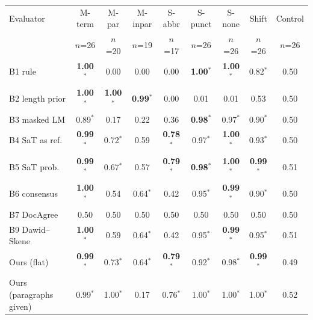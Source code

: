 \begin{tabular}{lcccccccc}
\toprule
Evaluator & M-term & M-par & M-inpar & S-abbr & S-punct & S-none & Shift & Control \\
 & {\tiny $n$=26} & {\tiny $n$=20} & {\tiny $n$=19} & {\tiny $n$=17} & {\tiny $n$=26} & {\tiny $n$=26} & {\tiny $n$=26} & {\tiny $n$=26} \\
\midrule
B1 rule & \textbf{1.00}$^*$ & 0.00 & 0.00 & 0.00 & \textbf{1.00}$^*$ & \textbf{1.00}$^*$ & 0.82$^*$ & 0.50 \\
B2 length prior & \textbf{1.00}$^*$ & \textbf{1.00}$^*$ & \textbf{0.99}$^*$ & 0.00 & 0.01 & 0.01 & 0.53 & 0.50 \\
B3 masked LM & 0.89$^*$ & 0.17 & 0.22 & 0.36 & \textbf{0.98}$^*$ & 0.97$^*$ & 0.90$^*$ & 0.50 \\
B4 SaT as ref. & \textbf{0.99}$^*$ & 0.72$^*$ & 0.59 & \textbf{0.78}$^*$ & 0.97$^*$ & \textbf{1.00}$^*$ & 0.93$^*$ & 0.50 \\
B5 SaT prob. & \textbf{0.99}$^*$ & 0.67$^*$ & 0.57 & \textbf{0.79}$^*$ & \textbf{0.98}$^*$ & \textbf{1.00}$^*$ & \textbf{0.99}$^*$ & 0.51 \\
B6 consensus & \textbf{1.00}$^*$ & 0.54 & 0.64$^*$ & 0.42 & 0.95$^*$ & \textbf{0.99}$^*$ & 0.90$^*$ & 0.50 \\
B7 DocAgree & 0.50 & 0.50 & 0.50 & 0.50 & 0.50 & 0.50 & 0.50 & 0.50 \\
B9 Dawid--Skene & \textbf{1.00}$^*$ & 0.59 & 0.64$^*$ & 0.42 & 0.95$^*$ & \textbf{0.99}$^*$ & 0.95$^*$ & 0.51 \\
Ours (flat) & \textbf{0.99}$^*$ & 0.73$^*$ & 0.64$^*$ & \textbf{0.79}$^*$ & 0.92$^*$ & 0.98$^*$ & \textbf{0.99}$^*$ & 0.49 \\
\midrule
Ours (paragraphs given) & 0.99$^*$ & 1.00$^*$ & 0.17 & 0.76$^*$ & 1.00$^*$ & 1.00$^*$ & 1.00$^*$ & 0.52 \\
\bottomrule
\end{tabular}
